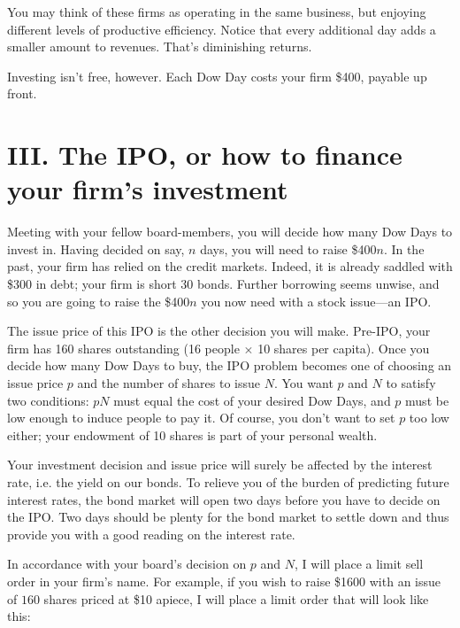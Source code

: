 You may think of these firms as operating in the same business, but
enjoying different levels of productive efficiency.  Notice that
every additional day adds a smaller amount to revenues.  That's
diminishing returns.

Investing isn't free, however.  Each Dow Day costs your firm \$400,
payable up front.

\section{III. The IPO, or how to finance your firm's investment}%
Meeting with your fellow board-members, you will decide how many Dow
Days to invest in.  Having decided on say, $n$ days, you will need to
raise \$400$n$.  In the past, your firm has relied on the credit
markets.  Indeed, it is already saddled with \$300 in debt; your firm
is short $30$ bonds.  Further borrowing seems unwise, and so you are
going to raise the \$400$n$ you now need with a stock issue---an IPO.

The issue price of this IPO is the other decision you will make.
Pre-IPO, your firm has 160 shares outstanding (16 people $\times$
10 shares per capita).  Once you decide how many Dow Days to buy,
the IPO problem becomes one of choosing an issue price $p$ and the
number of shares to issue $N$.  You want $p$ and $N$ to satisfy two
conditions: $pN$ must equal the cost of your desired Dow Days, and
$p$ must be low enough to induce people to pay it.  Of course, you
don't want to set $p$ too low either; your endowment of 10 shares
is part of your personal wealth.

Your investment decision and issue price will surely be affected by
the interest rate, i.e. the yield on our bonds.  To relieve you of
the burden of predicting future interest rates, the bond market will
open two days before you have to decide on the IPO.  Two days should
be plenty for the bond market to settle down and thus provide you
with a good reading on the interest rate.%

In accordance with your board's decision on $p$ and $N$, I will place
a limit sell order in your firm's name.  For example, if you wish to
raise \$1600 with an issue of $160$ shares priced at \$10 apiece, I
will place a limit order that will look like this:

